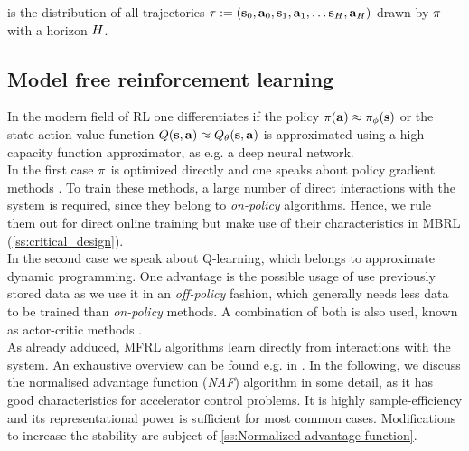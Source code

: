 \documentclass[
reprint,
amsmath,amssymb,amsfonts,clevref,
aps,
prstab,
]{revtex4-2}
\begin{document}
is the distribution of all trajectories $\tau := (\mathbf{s}_0, \mathbf{a}_0, \mathbf{s}_1, \mathbf{a}_1,\dots \mathbf{s}_H,\mathbf{a}_H)$ drawn by $\pi$ with a horizon $H$.

	\subsection{Model free reinforcement learning}\label{s:Model free reinforcement learning}
		In the modern field of RL one differentiates if the policy $\pi(\mathbf{a})\approx \pi_\phi(\mathbf{s})$ or the state-action value function $Q(\mathbf{s},\mathbf{a}) \approx Q_\theta(\mathbf{s},\mathbf{a})$ is approximated using a high capacity function approximator, as e.g. a deep neural network.\\
	In the first case $\pi$ is optimized directly and one speaks about policy gradient methods \cite{Sutton2018, Williams1992,Baxter2011,pmlr-v28-levine13, Schulman2015,Schulman2017}. To train these methods, a large number of direct interactions with the system is required, since they belong to \emph{on-policy} algorithms. Hence, we rule them out for direct online training but make use of their characteristics in MBRL (\cref{ss:critical_design}).\\
	 In the second case we speak about Q-learning, which belongs to approximate dynamic programming. One advantage is the possible usage of use previously stored data as we use it in an \emph{off-policy} fashion, which generally needs less data to be trained than \emph{on-policy} methods. A combination of both is also used, known as actor-critic methods \cite{Szepesvari2010,Lillicrap2015,Silver2014}.\\
	 As already adduced, MFRL algorithms learn directly from interactions with the system. An exhaustive overview can be found e.g. in \cite{Sutton2018,Levine2020}. In the following, we discuss the normalised advantage function (\emph{NAF}) algorithm \cite{Gu2016} in some detail, as it has good characteristics for accelerator control problems. It is highly sample-efficiency  and its representational power is sufficient for most common cases\cite{Kain2020,Hirlaender2020a}. Modifications to increase the stability are subject of \cref{ss:Normalized advantage function}.
\end{document}
